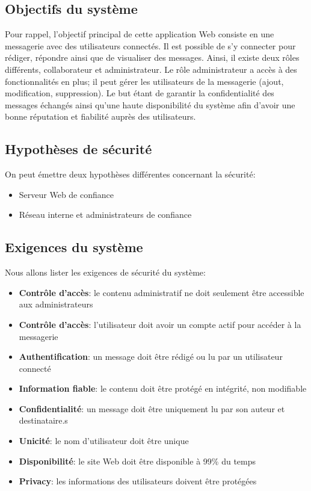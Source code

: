 \documentclass[a4paper,10pt]{article}
\begin{document}
    \subsection*{Objectifs du système}
    Pour rappel, l’objectif principal de cette application Web consiste en une messagerie avec des utilisateurs connectés. Il est possible de s’y connecter pour rédiger, répondre ainsi que de visualiser des messages. 
    Ainsi, il existe deux rôles différents, collaborateur et administrateur. Le rôle administrateur a accès à des fonctionnalités en plus; il peut gérer les utilisateurs de la messagerie (ajout, modification, suppression).
    Le but étant de garantir la confidentialité des messages échangés ainsi qu’une haute disponibilité du système afin d’avoir une bonne réputation et fiabilité auprès des utilisateurs.
    \subsection*{Hypothèses de sécurité}
    On peut émettre deux hypothèses différentes concernant la sécurité: 
    \begin{onehalfspacing}
    \begin{itemize}
    \item Serveur Web de confiance
    \item Réseau interne et administrateurs de confiance
    \end{itemize}
    \end{onehalfspacing}
    \subsection*{Exigences du système}
    Nous allons lister les exigences de sécurité du système: 
    \begin{onehalfspacing}
    \begin{itemize}
    \item \textbf{Contrôle d’accès}: le contenu administratif ne doit seulement être accessible aux administrateurs
    \item \textbf{Contrôle d’accès}: l’utilisateur doit avoir un compte actif pour accéder à la messagerie
    \item \textbf{Authentification}: un message doit être rédigé ou lu par un utilisateur connecté
    \item \textbf{Information fiable}: le contenu doit être protégé en intégrité, non modifiable
    \item \textbf{Confidentialité}: un message doit être uniquement lu par son auteur et destinataire.s
    \item \textbf{Unicité}: le nom d'utilisateur doit être unique
    \item \textbf{Disponibilité}: le site Web doit être disponible à 99\% du temps
    \item \textbf{Privacy}: les informations des utilisateurs doivent être protégées
    \end{itemize}
    \end{onehalfspacing}
\end{document}
